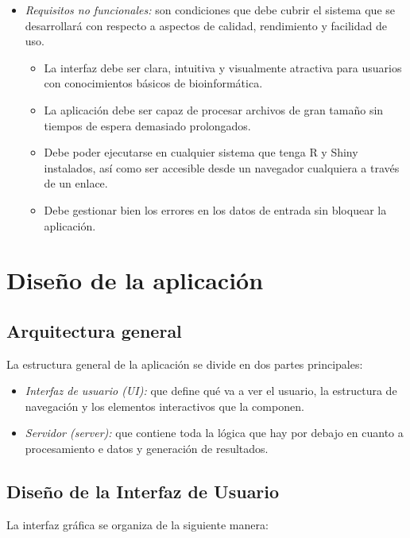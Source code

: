 \begin{itemize}
    \item \textit{Requisitos no funcionales:} son condiciones que debe cubrir el sistema que se desarrollará con respecto a aspectos de calidad, rendimiento y
    facilidad de uso.
    \begin{itemize}
        \item La interfaz debe ser clara, intuitiva y visualmente atractiva para usuarios con conocimientos básicos de bioinformática.
        \item La aplicación debe ser capaz de procesar archivos de gran tamaño sin tiempos de espera demasiado prolongados.
        \item Debe poder ejecutarse en cualquier sistema que tenga R y Shiny instalados, así como ser accesible desde un navegador cualquiera a través de un enlace.
        \item Debe gestionar bien los errores en los datos de entrada sin bloquear la aplicación.
    \end{itemize}
\end{itemize}

\section{Diseño de la aplicación}

\subsection{Arquitectura general}

La estructura general de la aplicación se divide en dos partes principales:

\begin{itemize}
    \item \textit{Interfaz de usuario (UI):} que define qué va a ver el usuario, la estructura de navegación y los elementos interactivos que la 
    componen.
    \item \textit{Servidor (server):} que contiene toda la lógica que hay por debajo en cuanto a procesamiento e datos y generación de resultados.
\end{itemize}

\subsection{Diseño de la Interfaz de Usuario}

La interfaz gráfica se organiza de la siguiente manera: 

